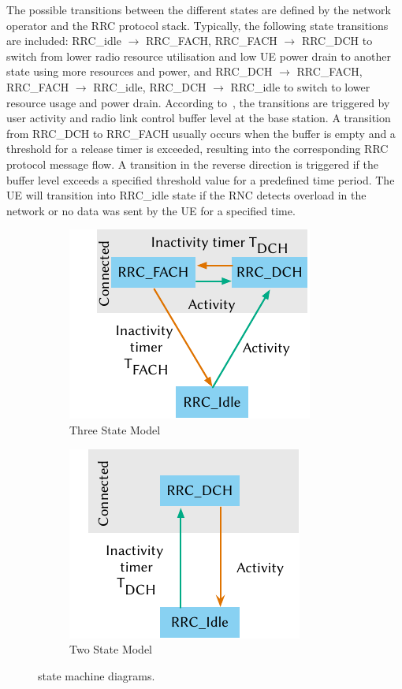The possible transitions between the different states are defined by the network operator and the \gls{RRC} protocol stack.
Typically, the following state transitions are included:
\gls{RRC_idle} \(\rightarrow\) \gls{RRC_FACH},
\gls{RRC_FACH} \(\rightarrow\) \gls{RRC_DCH} to switch from lower radio resource utilisation and low \gls{UE} power drain to another state using more resources and power, and
\gls{RRC_DCH} \(\rightarrow\) \gls{RRC_FACH},
\gls{RRC_FACH} \(\rightarrow\) \gls{RRC_idle},
\gls{RRC_DCH} \(\rightarrow\) \gls{RRC_idle} to switch to lower resource usage and power drain.
According to~\cite{Perala2009,Qian2010a}, the transitions are triggered by user activity and radio link control buffer level at the base station.
A transition from \gls{RRC_DCH} to \gls{RRC_FACH} usually occurs when the buffer is empty and a threshold for a release timer is exceeded, resulting into the corresponding \gls{RRC} protocol message flow.
A transition in the reverse direction is triggered if the buffer level exceeds a specified threshold value for a predefined time period.
The \gls{UE} will transition into \gls{RRC_idle} state if the \gls{RNC} detects overload in the network or no data was sent by the \gls{UE} for a specified time.

\begin{figure}
	\begin{subfigure}[b]{.5\textwidth}
	\centering
	\includegraphics{network/background/figures/three_states}
	\caption{Three State Model}\label{fig:network:background:rrc_state_machines:three_states}
	\end{subfigure}
	\begin{subfigure}[b]{.5\textwidth}
	\centering
	\includegraphics{network/background/figures/two_states}
	\caption{Two State Model}\label{fig:network:background:rrc_state_machines:two_states}
	\end{subfigure}
	\caption{ state machine diagrams.}\label{fig:network:background:rrc_state_machines}
\end{figure}

